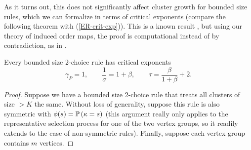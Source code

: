 \documentclass[twoside,10pt]{article}
\begin{document}
As it turns out, this does not significantly affect cluster growth for bounded size rules, which we can formalize in terms of critical exponents (compare the following theorem with (\ref{ER-crit-exp})). This is a known result \cite{RW-bounded}, but using our theory of induced order maps, the proof is computational instead of by contradiction, as in \cite{RW-bounded}.

\begin{thrm}[]
Every bounded size 2-choice rule has critical exponents
\[
	\gamma_{P}=1, \qquad \frac{1}{\sigma} =1+\beta, \qquad \tau = \frac{\beta}{1+\beta} +2.
\]
\end{thrm}
\begin{proof}
	Suppose we have a bounded size 2-choice rule that treats all clusters of size $>K$ the same. Without loss of generality, suppose this rule is also symmetric with $\phi(s) = \P{ \kappa=s }$ (this argument really only applies to the representative selection process for one of the two vertex groups, so it readily extends to the case of non-symmetric rules). Finally, suppose each vertex group contains $m$ vertices.


\end{proof}
\end{document}
